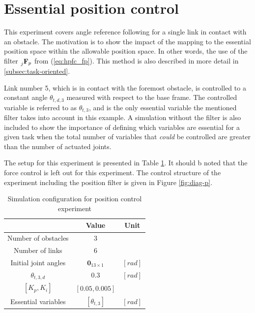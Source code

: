\section{Essential position control}\label{sec:ess-pos}

This experiment covers angle reference following for a single link in contact with an obstacle. The motivation is to show the impact of the mapping to the essential position space within the allowable position space. In other words, the use of the filter $\prescript{}{j}{\mathbf{F}}_{p}$ from (\ref{eq:hpfc_fp}). This method is also described in more detail in \ref{subsec:task-oriented}.

Link number 5, which is in contact with the foremost obstacle, is controlled to a constant angle $\theta_{t,d,3}$ measured with respect to the base frame. The controlled variable is referred to as $\theta_{t,3}$, and is the only essential variable the mentioned filter takes into account in this example. A simulation without the filter is also included to show the importance of defining which variables are essential for a given task when the total number of variables that \textit{could} be controlled are greater than the number of actuated joints.

The setup for this experiment is presented in Table \ref{tab:exp_single_pos}. It should b noted that the force control is left out for this experiment. The control structure of the experiment including the position filter is given in Figure \ref{fig:diag-p}.

\begin{table}[]
    \centering
    \begin{tabular}{|c|c|c|}
        \hline
        & Value & Unit\\
        \hline
        Number of obstacles & $3$ & \\
        Number of links & $6$ & \\
        Initial joint angles & $\mathbf{0}_{13 \times 1}$ & $[rad]$ \\
        $\theta_{t,3,d}$ & $0.3$ & $[rad]$ \\
        $[K_p, K_i]$ & $[0.05, 0.005]$ &\\
        Essential variables & $[\theta_{t,3}]$ & $[rad]$ \\
        \hline
    \end{tabular}
    \caption{Simulation configuration for position control experiment}
    \label{tab:exp_single_pos}
\end{table}

